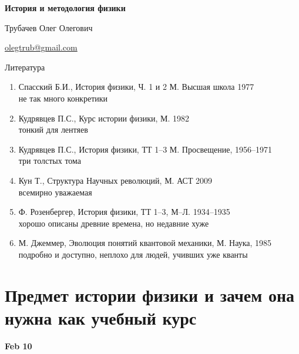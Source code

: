 \documentclass[a4paper, 12pt]{article}
\begin{document}
\null
\vfill

\begin{center}
	\begin{Large}
		\textbf{История и методология физики}
	\end{Large}

	\vspace{\baselineskip}

	Трубачев Олег Олегович

	\href{mailto:olegtrub@gmail.com}{olegtrub@gmail.com}
\end{center}

\vfill

Литература
\begin{enumerate}
	\item Спасский Б.И., История физики, Ч. 1 и 2 М. Высшая школа 1977
		\\ не так много конкретики
	\item Кудрявцев П.С., Курс истории физики, М. 1982
		\\ тонкий для лентяев
	\item Кудрявцев П.С., История физики, ТТ 1--3 М. Просвещение, 1956--1971
		\\ три толстых тома
	\item Кун Т., Структура Научных революций, М. АСТ 2009
		\\ всемирно уважаемая
	\item Ф. Розенбергер, История физики, ТТ 1--3, М--Л. 1934--1935
		\\ хорошо описаны древние времена, но недавние хуже
	\item М. Джеммер, Эволюция понятий квантовой механики, М. Наука, 1985
		\\ подробно и доступно, неплохо для людей, учивших уже кванты
\end{enumerate}

\clearpage

\tableofcontents

\clearpage

\section{Предмет истории физики и зачем она нужна как учебный курс}%

\hfill\textbf{Feb 10}
\end{document}
